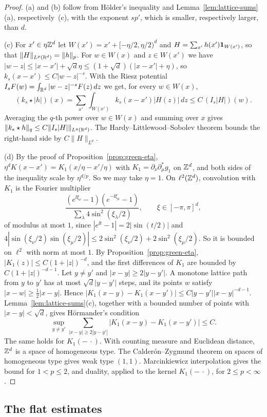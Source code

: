 \begin{proof}
(a) and (b) follow from H\"older's inequality and Lemma~\ref{lem:lattice-sums}(a), respectively~(c), with the exponent $sp'$, which is smaller, respectively larger, than $d$.

(c) For $x'\in\eta\mathbb Z^d$ let $W(x')=x'+[-\eta/2,\eta/2)^d$ and $H=\sum_{x'}h(x')\mathbf 1_{W(x')}$, so that $\|H\|_{L^p(\mathbb R^d)}=\|h\|_p$. For $w\in W(x)$ and $z\in W(x')$ we have $|w-z|\le|x-x'|+\sqrt d\eta\le(1+\sqrt d)(|x-x'|+\eta)$, so $k_s(x-x')\le C|w-z|^{-s}$. With the Riesz potential $I_sF(w)=\int_{\mathbb R^d}|w-z|^{-s}F(z)\,dz$ we get, for every $w\in W(x)$,
\[
(k_s\star|h|)(x)=\sum_{x'}\int_{W(x')}k_s(x-x')|H(z)|\,dz\le C\,(I_s|H|)(w).
\]
Averaging the $q$-th power over $w\in W(x)$ and summing over $x$ gives $\|k_s\star h\|_q\le C\|I_s|H|\|_{L^q(\mathbb R^d)}$. The Hardy--Littlewood--Sobolev theorem \cite[Ch.~V, \S1.2, Theorem~1]{Stein70} bounds the right-hand side by $C\|H\|_{L^p}$.

(d) By the proof of Proposition~\ref{prop:green-eta}, $\eta^dK(x-x')=K_1(x/\eta-x'/\eta)$ with $K_1=\partial_\nu\partial^*_\mu g_1$ on $\mathbb Z^d$, and both sides of the inequality scale by $\eta^{d/p}$. So we may take $\eta=1$. On $\ell^2(\mathbb Z^d)$, convolution with $K_1$ is the Fourier multiplier
\[
\frac{(e^{\ii\xi_\nu}-1)(e^{-\ii\xi_\mu}-1)}{\sum_\lambda4\sin^2(\xi_\lambda/2)},\qquad\xi\in[-\pi,\pi]^d,
\]
of modulus at most $1$, since $|e^{\ii t}-1|=2|\sin(t/2)|$ and $4|\sin(\xi_\nu/2)\sin(\xi_\mu/2)|\le2\sin^2(\xi_\nu/2)+2\sin^2(\xi_\mu/2)$. So it is bounded on $\ell^2$ with norm at most $1$. By Proposition~\ref{prop:green-eta}, $|K_1(z)|\le C(1+|z|)^{-d}$, and the first differences of $K_1$ are bounded by $C(1+|z|)^{-d-1}$. Let $y\ne y'$ and $|x-y|\ge2|y-y'|$. A monotone lattice path from $y$ to $y'$ has at most $\sqrt d|y-y'|$ steps, and its points $w$ satisfy $|x-w|\ge\frac12|x-y|$. Hence $|K_1(x-y)-K_1(x-y')|\le C|y-y'||x-y|^{-d-1}$. Lemma~\ref{lem:lattice-sums}(c), together with a bounded number of points with $|x-y|<\sqrt d$, gives H\"ormander's condition
\[
\sup_{y\ne y'}\sum_{|x-y|\ge2|y-y'|}|K_1(x-y)-K_1(x-y')|\le C .
\]
The same holds for $K_1(-\,\cdot)$. With counting measure and Euclidean distance, $\mathbb Z^d$ is a space of homogeneous type. The Calder\'on--Zygmund theorem on spaces of homogeneous type \cite[Ch.~I]{Stein93} gives weak type $(1,1)$. Marcinkiewicz interpolation gives the bound for $1<p\le2$, and duality, applied to the kernel $K_1(-\,\cdot)$, for $2\le p<\infty$.
\end{proof}

\subsection{The flat estimates}

